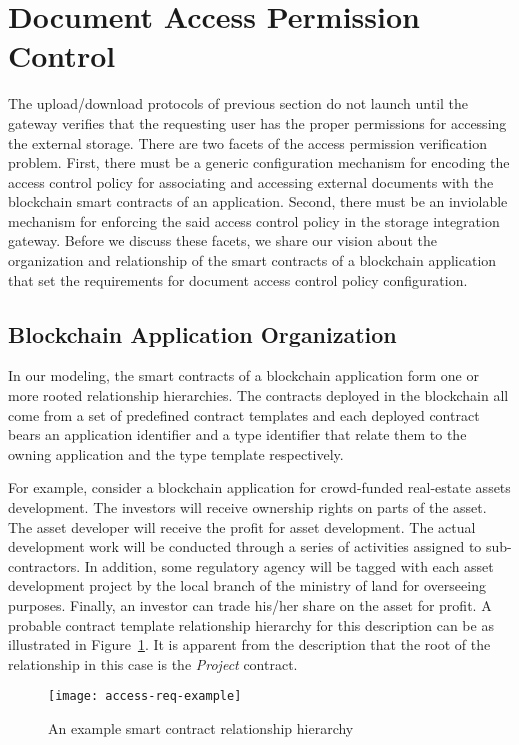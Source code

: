 
\section{Document Access Permission Control}
\label{s-accr}
The upload/download protocols of previous section do not launch until the gateway verifies that the requesting user has the proper permissions for accessing the external storage. There are two facets of the access permission verification problem. First, there must be a generic configuration mechanism for encoding the access control policy for associating and accessing external documents with the blockchain smart contracts of an application. Second, there must be an inviolable mechanism for enforcing the said access control policy in the storage integration gateway. Before we discuss these facets, we share our vision about the organization and relationship of the smart contracts of a blockchain application that set the requirements for document access control policy configuration.

\subsection{Blockchain Application Organization}
In our modeling, the smart contracts of a blockchain application form one or more rooted relationship hierarchies. The contracts deployed in the blockchain all come from a set of predefined contract templates and each deployed contract bears an application identifier and a type identifier that relate them to the owning application and the type template respectively.

For example, consider a blockchain application for crowd-funded real-estate assets development. The investors will receive ownership rights on parts of the asset. The asset developer will receive the profit for asset development. The actual development work will be conducted through a series of activities assigned to sub-contractors. In addition, some regulatory agency will be tagged with each asset development project by the local branch of the ministry of land for overseeing purposes. Finally, an investor can trade his/her share on the asset for profit. A probable contract template relationship hierarchy for this description can be as illustrated in Figure~\ref{fig-2}. It is apparent from the description that the root of the relationship in this case is the {\it Project} contract.
\begin{figure}[h]
\centering
\texttt{[image: access-req-example]}                    
\caption{An example smart contract relationship hierarchy}\label{fig-2}
\end{figure}

